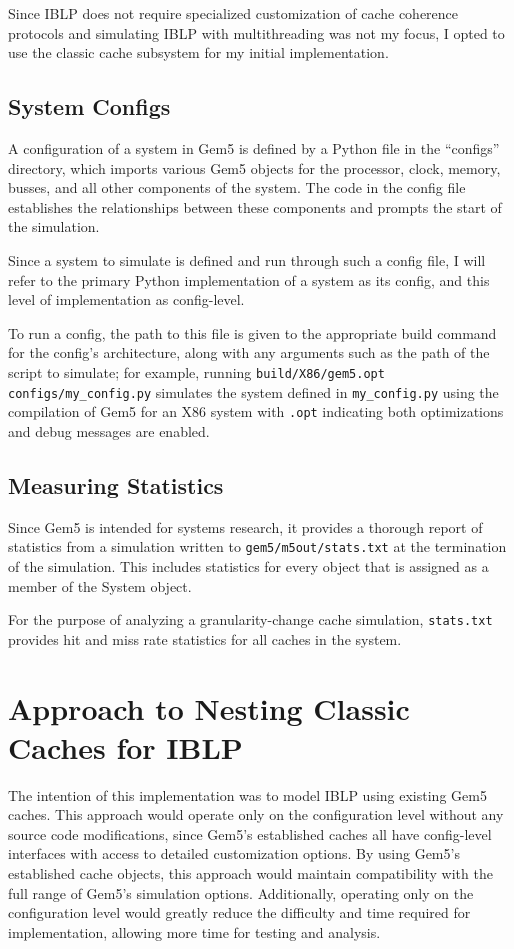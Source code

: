 \documentclass[12pt,twoside]{reedthesis}
\begin{document}
	Since IBLP does not require specialized customization of cache coherence protocols and simulating IBLP with multithreading was not my focus, I opted to use the classic cache subsystem for my initial implementation.

	\subsection*{System Configs}

	A configuration of a system in Gem5 is defined by a Python file in the ``configs'' directory, which imports various Gem5 objects for the processor, clock, memory, busses, and all other components of the system. The code in the config file establishes the relationships between these components and prompts the start of the simulation.

	Since a system to simulate is defined and run through such a config file, I will refer to the primary Python implementation of a system as its config, and this level of implementation as config-level.

	To run a config, the path to this file is given to the appropriate build command for the config's architecture, along with any arguments such as the path of the script to simulate; for example, running \verb`build/X86/gem5.opt configs/my_config.py` simulates the system defined in \verb`my_config.py` using the compilation of Gem5 for an X86 system with \verb`.opt` indicating both optimizations and debug messages are enabled.

	\subsection*{Measuring Statistics}

	Since Gem5 is intended for systems research, it provides a thorough report of statistics from a simulation written to \verb`gem5/m5out/stats.txt` at the termination of the simulation. This includes statistics for every object that is assigned as a member of the System object.

	For the purpose of analyzing a granularity-change cache simulation, \verb`stats.txt` provides hit and miss rate statistics for all caches in the system.

\section{Approach to Nesting Classic Caches for IBLP}

The intention of this implementation was to model IBLP using existing Gem5 caches. This approach would operate only on the configuration level without any source code modifications, since Gem5's established caches all have config-level interfaces with access to detailed customization options. By using Gem5's established cache objects, this approach would maintain compatibility with the full range of Gem5's simulation options. Additionally, operating only on the configuration level would greatly reduce the difficulty and time required for implementation, allowing more time for testing and analysis.
\end{document}
